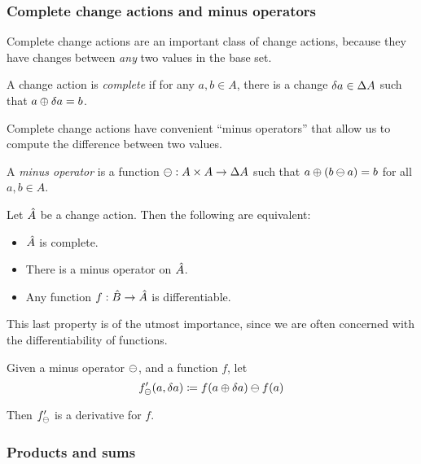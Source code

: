 \subsubsection{Complete change actions and minus operators}

Complete change actions are an important class of change actions, because they
have changes between \emph{any} two values in the base set.

\begin{defn}
  A change action is \emph{complete} if for any $a, b \in A$, there is
  a change $\delta a \in \Delta A$ such that $a \oplus \delta a = b$.
\end{defn}

Complete change actions have convenient ``minus operators'' that allow us to
compute the difference between two values.

\begin{defn}
  A \emph{minus operator} is a function $\ominus: A \times A \rightarrow
  \Delta A$ such that $a \oplus (b \ominus a) = b$ for all $a, b \in A$.
\end{defn}

\begin{prop}
  Let $\hat{A}$ be a change action. Then the following are equivalent:
  \begin{itemize}
    \item $\hat{A}$ is complete.
    \item There is a minus operator on $\hat{A}$.
    \item Any function $f: \hat{B} \rightarrow \hat{A}$ is differentiable.
  \end{itemize}
\end{prop}

This last property is of the utmost importance, since we are often concerned with the differentiability
of functions.

\begin{prop}
  \label{prop:minusDerivatives}
  Given a minus operator $\ominus$, and a function $f$, let
  \begin{displaymath}
    f'_\ominus(a, \delta a) \coloneqq f(a \oplus \delta a) \ominus f(a)
  \end{displaymath}

  Then $f'_\ominus$ is a derivative for $f$.
\end{prop}

\subsubsection{Products and sums}

